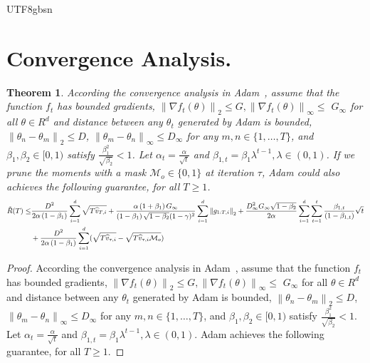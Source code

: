 \documentclass{article}
\theoremstyle{plain}
\newtheorem{theorem}{Theorem}[section]
\theoremstyle{definition}
\theoremstyle{remark}
\begin{document}
\begin{CJK}{UTF8}{gbsn}
\section{Convergence Analysis.}
\label{app:conv}
\begin{theorem}\label{theorem}
According the convergence analysis in Adam~\cite{kingma2014adam}, assume that the function $f_t$ has bounded gradients, $\left\|\nabla f_t(\theta)\right\|_2 \leq G,\left\|\nabla f_t(\theta)\right\|_{\infty} \leq$ $G_{\infty}$ for all $\theta \in R^d$ and distance between any $\theta_t$ generated by Adam is bounded, $\left\|\theta_n-\theta_m\right\|_2 \leq D$, $\left\|\theta_m-\theta_n\right\|_{\infty} \leq D_{\infty}$ for any $m, n \in\{1, \ldots, T\}$, and $\beta_1, \beta_2 \in[0,1)$ satisfy $\frac{\beta_1^2}{\sqrt{\beta_2}}<1$. Let $\alpha_t=\frac{\alpha}{\sqrt{t}}$ and $\beta_{1, t}=\beta_1 \lambda^{t-1}, \lambda \in(0,1)$. If we prune the moments with a mask $\mathcal{M}_o\in \{0,1\}$ at iteration $\tau$, 
Adam could also achieves the following guarantee, for all $T \geq 1$.
\begin{equation}
	\small
	\begin{aligned}\label{eq2}
		\tilde R(T) 
		\leq & \frac{D^2}{2 \alpha\left(1-\beta_1\right)} \sum_{i=1}^d \sqrt{T \widehat{v}_{T, i}}
		+\frac{\alpha\left(1+\beta_1\right) G_{\infty}}{\left(1-\beta_1\right) \sqrt{1-\beta_2}(1-\gamma)^2} \sum_{i=1}^d\left\|g_{1: T, i}\right\|_2 
		+\frac{D_{\infty}^2 G_{\infty} \sqrt{1-\beta_2}}{2 \alpha} \sum_{i=1}^d \sum_{t=1}^t \frac{\beta_{1, t}}{\left(1-\beta_{1, t}\right)} \sqrt{t}\\
		& +\frac{D^2}{2 \alpha\left(1-\beta_1\right)} \sum_{i=1}^d (\sqrt{T \widehat{v}_{\tau, i}} - \sqrt{T \widehat{v}_{\tau, i}\mathcal{M}_o})
	\end{aligned}
\end{equation}
\end{theorem}
\begin{proof}
According the convergence analysis in Adam~\cite{kingma2014adam}, assume that the function $f_t$ has bounded gradients, $\left\|\nabla f_t(\theta)\right\|_2 \leq G,\left\|\nabla f_t(\theta)\right\|_{\infty} \leq$ $G_{\infty}$ for all $\theta \in R^d$ and distance between any $\theta_t$ generated by Adam is bounded, $\left\|\theta_n-\theta_m\right\|_2 \leq D$, $\left\|\theta_m-\theta_n\right\|_{\infty} \leq D_{\infty}$ for any $m, n \in\{1, \ldots, T\}$, and $\beta_1, \beta_2 \in[0,1)$ satisfy $\frac{\beta_1^2}{\sqrt{\beta_2}}<1$. Let $\alpha_t=\frac{\alpha}{\sqrt{t}}$ and $\beta_{1, t}=\beta_1 \lambda^{t-1}, \lambda \in(0,1)$. Adam achieves the following guarantee, for all $T \geq 1$.

\end{proof}
\end{CJK}
\end{document}
